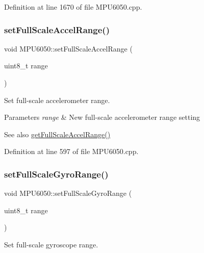 Definition at line 1670 of file M\+P\+U6050.\+cpp.

\mbox{\label{classMPU6050_a64eb78e8e359c541beaf8664db3421d1}} 
\subsubsection{\texorpdfstring{setFullScaleAccelRange()}{setFullScaleAccelRange()}}
{\footnotesize\ttfamily void M\+P\+U6050\+::set\+Full\+Scale\+Accel\+Range (\begin{DoxyParamCaption}\item[{uint8\+\_\+t}]{range }\end{DoxyParamCaption})}



Set full-\/scale accelerometer range. 


\begin{DoxyParams}{Parameters}
{\em range} & New full-\/scale accelerometer range setting \\
\hline
\end{DoxyParams}
\begin{DoxySeeAlso}{See also}
\mbox{\hyperlink{classMPU6050_a0fe2dad60c170cee7d614e08f243ffd0}{get\+Full\+Scale\+Accel\+Range()}} 
\end{DoxySeeAlso}


Definition at line 597 of file M\+P\+U6050.\+cpp.

\mbox{\label{classMPU6050_a72afc0b6f221c9336f635b5637c62dae}} 
\subsubsection{\texorpdfstring{setFullScaleGyroRange()}{setFullScaleGyroRange()}}
{\footnotesize\ttfamily void M\+P\+U6050\+::set\+Full\+Scale\+Gyro\+Range (\begin{DoxyParamCaption}\item[{uint8\+\_\+t}]{range }\end{DoxyParamCaption})}



Set full-\/scale gyroscope range. 


